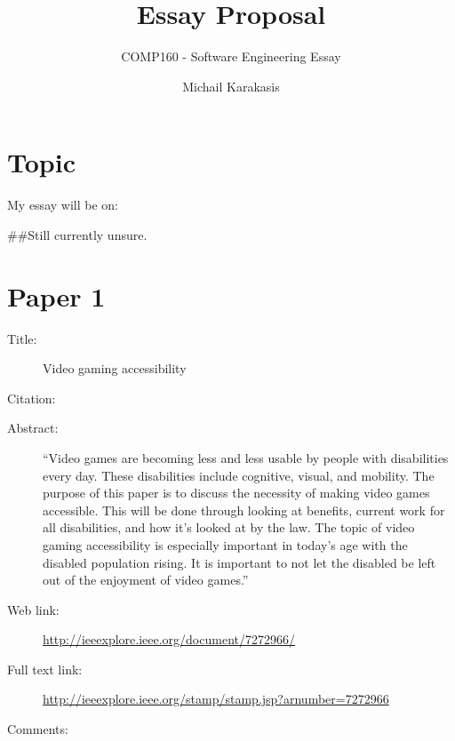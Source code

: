 \documentclass{scrartcl}
\title{Essay Proposal}
\subtitle{COMP160 - Software Engineering Essay}
\author{Michail Karakasis}
\begin{document}
\maketitle

\section*{Topic}

My essay will be on:

##Still currently unsure.

\section*{Paper 1}
\begin{description}
\item[Title:] Video gaming accessibility
\item[Citation:] \cite{McPheron}
\item[Abstract:] ``Video games are becoming less and less usable by people with disabilities every day. These disabilities include cognitive, visual, and mobility. The purpose of this paper is to discuss the necessity of making video games accessible. This will be done through looking at benefits, current work for all disabilities, and how it's looked at by the law. The topic of video gaming accessibility is especially important in today's age with the disabled population rising. It is important to not let the disabled be left out of the enjoyment of video games.''
\item[Web link:] \url {http://ieeexplore.ieee.org/document/7272966/}
\item[Full text link:] \url {http://ieeexplore.ieee.org/stamp/stamp.jsp?arnumber=7272966}
\item[Comments:] 
\end{description}
\end{document}
